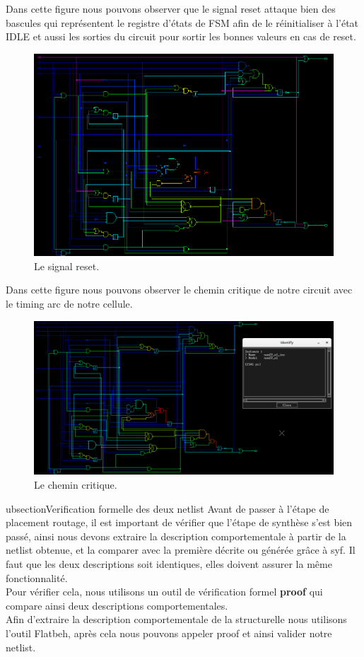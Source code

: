 \documentclass[12pt]{article}
\begin{document}
Dans cette figure nous pouvons observer que le signal reset attaque bien des bascules qui représentent le registre d'états de FSM afin de le réinitialiser à l'état IDLE et aussi les sorties du circuit pour sortir les bonnes valeurs en cas de reset.
\begin{figure}
\begin{center}
  \includegraphics[width = 12cm]{pic/reset.png}
\end{center}
\caption{Le signal reset.}
\end{figure}

Dans cette figure nous pouvons observer le chemin critique de notre circuit avec le timing arc de notre cellule.

\begin{figure}
\begin{center}
  \includegraphics[width = 12cm]{pic/critical.png}
\end{center}
\caption{Le chemin critique.}
\end{figure}

ubsection{Verification formelle des deux netlist}
Avant de passer à l'étape de placement routage, il est important de vérifier que l'étape de synthèse s'est bien passé, ainsi nous devons extraire la description comportementale à partir de la netlist obtenue, et la comparer avec la première décrite ou générée grâce à syf. Il faut que les deux descriptions soit identiques, elles doivent assurer la même fonctionnalité.\\
Pour vérifier cela, nous utilisons un outil de vérification formel \textbf{proof} qui compare ainsi deux descriptions comportementales.\\
Afin d'extraire la description comportementale de la structurelle nous utilisons l'outil Flatbeh, après cela nous pouvons appeler  proof et ainsi valider notre netlist.
\end{document}
